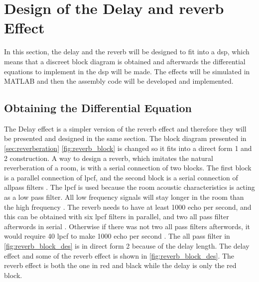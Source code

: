 \section{Design of the Delay and \gls{reverb} Effect}
In this section, the delay and the \gls{reverb} will be designed to fit into a \gls{dsp}, which means that a discreet block diagram is obtained and afterwards the differential equations to implement in the \gls{dsp} will be made. The effects will be simulated in MATLAB and then the assembly code will be developed and implemented. 


\subsection{Obtaining the Differential Equation}\label{sec:reverb_develop}
The Delay effect is a simpler version of the \gls{reverb} effect and therefore they will be presented and designed in the same section. The block diagram presented in \autoref{sec:reverberation} \autoref{fig:reverb_block} is changed so it fits into a direct form 1 and 2 construction.
A way to design a \gls{reverb}, which imitates the natural reverberation of a room, is with a serial connection of two blocks. The first block is a parallel connection of \gls{lpcf}, and the second block is a serial connection of allpass filters \citep{natural_sounding_revorb}. 
The \gls{lpcf} is used because the room acoustic characteristics is acting as a low pass filter. All low frequency signals will stay longer in the room than the high frequency \citep{rfi}. The \gls{reverb} needs to have at least 1000 echo per second, and this can be obtained with six \gls{lpcf} filters in parallel, and two all pass filter afterwords in serial \citep{DAFX}. Otherwise if there was not two all pass filters afterwords, it would require 40 \gls{lpcf} to make 1000 echo per second \citep{natural_sounding_revorb}. The all pass filter in \autoref{fig:reverb_block_des} is in direct form 2 because of the delay length. The delay effect and some of the \gls{reverb} effect is shown in \autoref{fig:reverb_block_des}. The \gls{reverb} effect is both the one in red and black while the delay is only the red block. 

\newpage


